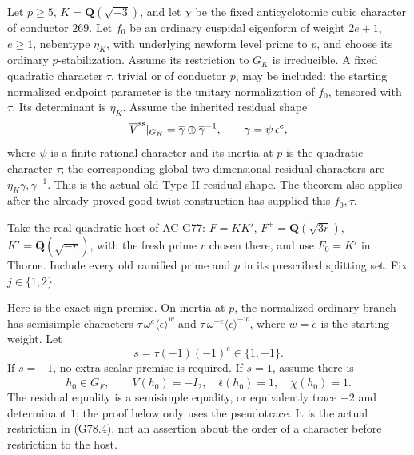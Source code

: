 \begin{theorem}
\label{thm:G78}
Let \(p\ge5\), \(K=\mathbf Q(\sqrt{-3})\), and let
\(\chi\) be the fixed anticyclotomic cubic character of conductor
\(269\).  Let \(f_0\) be an ordinary cuspidal eigenform of weight
\(2e+1\), \(e\ge1\), nebentype \(\eta_K\), with underlying newform level prime
to \(p\), and choose its ordinary \(p\)-stabilization.  Assume its restriction to \(G_K\) is irreducible.
A fixed quadratic character \(\tau\), trivial or of conductor
\(p\), may be included: the starting normalized endpoint
parameter is the unitary normalization of \(f_0\), tensored
with \(\tau\).
Its determinant is \(\eta_K\).
Assume the inherited residual shape
\[
 \overline V^{\rm ss}|_{G_K}=
       \overline\gamma\oplus\overline\gamma^{-1},
 \qquad \gamma=\psi\,\epsilon^e,
\]
where \(\psi\) is a finite rational character and its inertia at \(p\)
is the quadratic character \(\tau\); the corresponding global
two-dimensional residual characters are
\(\eta_K\overline\gamma,\overline\gamma^{-1}\).
This is the actual old Type II residual shape.
The theorem also applies after the already proved good-twist
construction has supplied this \(f_0,\tau\).

Take the real quadratic host of AC-G77:
\(F=KK'\), \(F^+=\mathbf Q(\sqrt{3r})\),
\(K'=\mathbf Q(\sqrt{-r})\), with the fresh prime \(r\) chosen
there, and use \(F_0=K'\) in Thorne.
Include every old ramified prime and \(p\) in its prescribed
splitting set.
Fix \(j\in\{1,2\}\).

Here is the exact sign premise.
On inertia at \(p\), the normalized ordinary branch has
semisimple characters
\(\tau\,\omega^e\langle\epsilon\rangle^{w}\) and
\(\tau\,\omega^{-e}\langle\epsilon\rangle^{-w}\),
where \(w=e\) is the starting weight.
Let
\[
                       s=\tau(-1)(-1)^e\in\{1,-1\}.
\]
If \(s=-1\), no extra scalar premise is required.
If \(s=1\), assume there is
\[
 h_0\in G_F,\qquad
 \overline V(h_0)=-I_2,\quad
 \overline\epsilon(h_0)=1,\quad \chi(h_0)=1.
 \tag{G78.4}
\]
The residual equality is a semisimple equality, or equivalently
trace \(-2\) and determinant \(1\); the proof below only uses the
pseudotrace.
It is the actual restriction in (G78.4), not an assertion about
the order of a character before restriction to the host.


\end{theorem}

